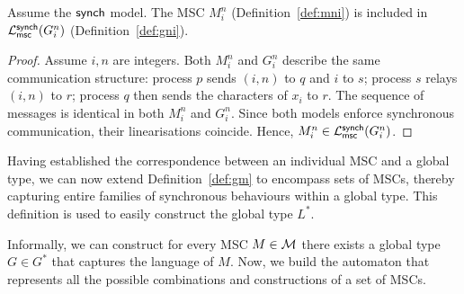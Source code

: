 \bigskip

\begin{lemma}\label{lmm:msgs}
Assume the $\mathsf{synch}$ model.
The MSC $M^n_i$ (Definition~\ref{def:mni}) is included in 
$\mathcal{L}_{\mathsf{msc}}^{\mathsf{synch}}(G_i^n)$ (Definition~\ref{def:gni}).
\end{lemma}

\begin{proof}
	Assume $i,n$ are integers.
	Both $M^n_i$ and $G_i^n$ describe the same communication structure:
	process $p$ sends $(i,n)$ to $q$ and $i$ to $s$;
	process $s$ relays $(i,n)$ to $r$;
	process $q$ then sends the characters of $x_i$ to $r$.
	The sequence of messages is identical in both 
	$M^n_i$ and $G_i^n$. Since both models enforce synchronous communication, 
	their linearisations coincide. 
	Hence, $M^n_i \in \mathcal{L}_{\mathsf{msc}}^{\mathsf{synch}}(G_i^n)$.
\end{proof}

Having established the correspondence between an individual MSC and a  
global type, we can now extend Definition~\ref{def:gm} to encompass  
sets of MSCs, thereby capturing entire families of synchronous  
behaviours within a global type. This definition is used to easily 
construct the global type $L^*$.

Informally, we can construct 
for every MSC $M\in\mathcal{M}$ there exists a global type $G\in G^*$ that
captures the language of $M$. Now, we build the automaton that represents
all the possible combinations and constructions of a set of MSCs.

\bigskip

